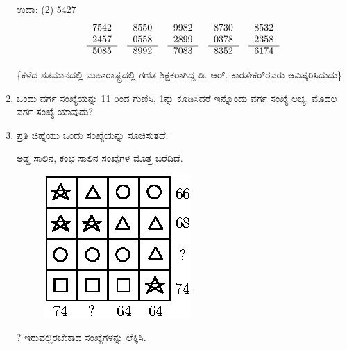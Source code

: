 \begin{enumerate}
ಉದಾ: (2) 5427
\begin{equation*}
\begin{tabular}[t]{r}
7542 \\
2457\\\cline{1-1} 
5085
\end{tabular}
\quad
\begin{tabular}[t]{r}
8550\\ 
0558\\\cline{1-1} 
8992
\end{tabular}
\quad
\begin{tabular}[t]{r}
9982\\ 
2899\\\cline{1-1} 
7083
\end{tabular}
\quad
\begin{tabular}[t]{r}
8730\\ 
0378\\\cline{1-1} 
8352
\end{tabular}
\quad
\begin{tabular}[t]{r}
8532\\ 
2358\\\cline{1-1} 
6174
\end{tabular}
\end{equation*}

\{ಕಳೆದ ಶತಮಾನದಲ್ಲಿ ಮಹಾರಾಷ್ಟ್ರದಲ್ಲಿ ಗಣಿತ ಶಿಕ್ಷಕರಾಗಿದ್ದ ಡಿ. ಆರ್. ಕಾರತೇಕರ್‌ರವರು ಆವಿಷ್ಕರಿಸಿದುದು\}

\item  ಒಂದು ವರ್ಗ ಸಂಖ್ಯೆಯನ್ನು 11 ರಿಂದ ಗುಣಿಸಿ, 1ನ್ನು ಕೂಡಿಸಿದರೆ ಇನ್ನೊಂದು ವರ್ಗ ಸಂಖ್ಯೆ ಲಭ್ಯ. ಮೊದಲ ವರ್ಗ ಸಂಖ್ಯೆ ಯಾವುದು? 

\item ಪ್ರತಿ ಚಿಹ್ನೆಯು ಒಂದು ಸಂಖ್ಯೆಯನ್ನು ಸೂಚಿಸುತದೆ. 

ಅಡ್ಡ ಸಾಲಿನ, ಕಂಭ ಸಾಲಿನ ಸಂಖ್ಯೆಗಳ ಮೊತ್ತ ಬರೆದಿದೆ. 

\begin{figure}[H]
\centering
\includegraphics{images/chap6/q30.eps}
\end{figure}

? ಇರುವಲ್ಲಿರಬೇಕಾದ ಸಂಖ್ಯೆಗಳನ್ನು ಲೆಕ್ಕಿಸಿ. 
\end{enumerate}

